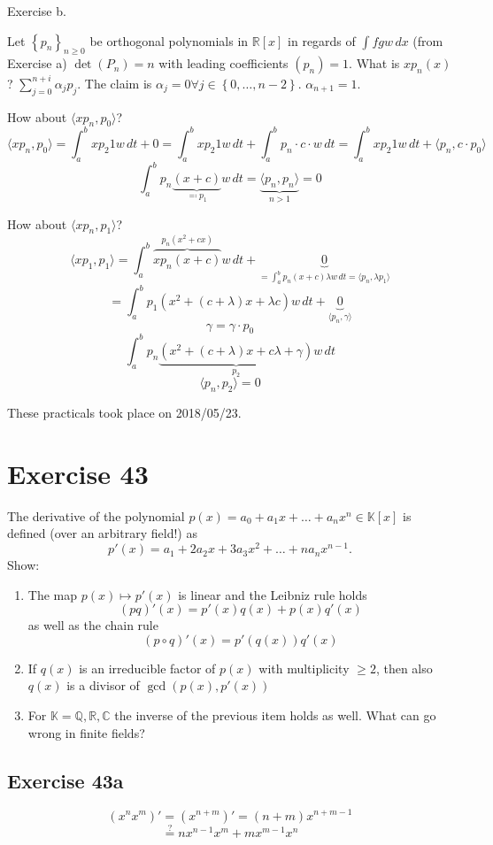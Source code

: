 \documentclass[a4paper]{article}
\theoremstyle{definition}
\newcommand\dateref[1]{These practicals took place on #1.\par}
\newcommand\set[1]{\left\{#1\right\}}
\newcommand\ip[2]{\langle{#1},{#2}\rangle}
\begin{document}
Exercise b.

Let $\set{p_n}_{n\geq 0}$ be orthogonal polynomials in $\mathbb R[x]$ in regards of $\int fgw \, dx$ (from Exercise a)
$\det(P_n) = n$ with leading coefficients $(p_n) = 1$.
What is $xp_n(x)$? $\sum_{j=0}^{n+i} \alpha_j p_j$.
The claim is $\alpha_j = 0 \forall j \in \set{0,\dots, n-2}$. $\alpha_{n+1} = 1$.

How about $\ip{xp_n}{p_0}$?
\[ \ip{xp_n}{p_0} = \int_{a}^b xp_2 1 w \, dt + 0 = \int_{a}^b xp_2 1 w \, dt + \int_{a}^b p_n \cdot c \cdot w \, dt = \int_{a}^b xp_2 1 w \, dt + \ip{p_n}{c \cdot p_0} \]
\[ \int_a^b p_n\underbrace{(x + c)}_{\eqqcolon p_1} w \,dt = \underbrace{\ip{p_n}{p_n}}_{n > 1} = 0 \]

How about $\ip{xp_n}{p_1}$?
\[ \ip{xp_1}{p_1} = \int_a^b \overbrace{x p_n (x + c)}^{p_n (x^2 + cx)} w \, dt + \underbrace{0}_{= \int_a^b p_n(x + c) \lambda w \, dt = \ip{p_n}{\lambda p_1}} \]
\[ = \int_a^b p_1(x^2 + (c + \lambda) x + \lambda c) w \, dt + \underbrace{0}_{\ip{p_n}{\gamma}} \]
\[ \gamma = \gamma \cdot p_0 \]
\[ \int_a^b p_n \underbrace{\left(x^2 + (c + \lambda) x + c \lambda + \gamma\right)}_{p_2} w \, dt \]
\[ \ip{p_n}{p_2} = 0 \]

\dateref{2018/05/23}

\section{Exercise 43}
\begin{ex}
  The derivative of the polynomial $p(x) = a_0 + a_1x + \dots + a_n x^n \in \mathbb K[x]$ is defined (over an arbitrary field!) as
  \[ p'(x) = a_1 + 2a_2 x + 3a_3 x^2 + \dots + na_n x^{n-1}. \]
  Show:
  \begin{enumerate}
    \item The map $p(x) \mapsto p'(x)$ is linear and the Leibniz rule holds
      \[ (pq)'(x) = p'(x) q(x) + p(x) q'(x) \]
      as well as the chain rule
      \[ (p \circ q)'(x) = p'(q(x)) q'(x) \]
    \item If $q(x)$ is an irreducible factor of $p(x)$ with multiplicity $\geq 2$, then also $q(x)$ is a divisor of $\operatorname{gcd}(p(x), p'(x))$
    \item For $\mathbb K = \mathbb Q, \mathbb R, \mathbb C$ the inverse of the previous item holds as well. What can go wrong in finite fields?
  \end{enumerate}
\end{ex}

\subsection{Exercise 43a}
\[ (x^n x^m)' = (x^{n + m})' = (n + m) x^{n + m-1} \]
\[ \overset{\text{?}}= n x^{n-1} x^m + m x^{m-1} x^n \]
\end{document}
